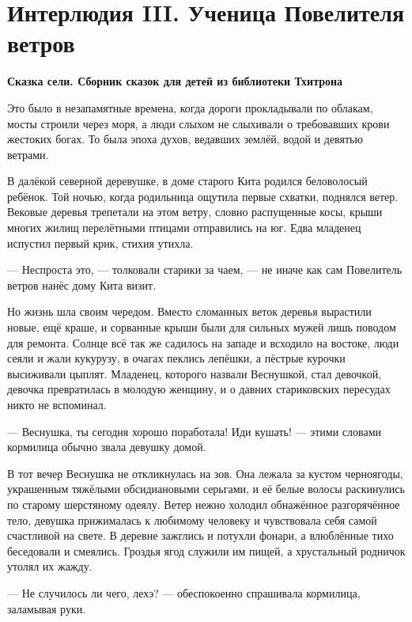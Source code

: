 \chapter*{Интерлюдия III. Ученица Повелителя ветров}


\textbf{Сказка сели.
Сборник сказок для детей из библиотеки Тхитрона}

Это было в незапамятные времена, когда дороги прокладывали по облакам, мосты строили через моря, а люди слыхом не слыхивали о требовавших крови жестоких богах.
То была эпоха духов, ведавших землёй, водой и девятью ветрами\FM.

В далёкой северной деревушке, в доме старого Кита родился беловолосый ребёнок.
Той ночью, когда родильница ощутила первые схватки, поднялся ветер.
Вековые деревья трепетали на этом ветру, словно распущенные косы, крыши многих жилищ перелётными птицами отправились на юг.
Едва младенец испустил первый крик, стихия утихла.

--- Неспроста это, --- толковали старики за чаем, --- не иначе как сам Повелитель ветров нанёс дому Кита визит.

Но жизнь шла своим чередом.
Вместо сломанных веток деревья вырастили новые, ещё краше, и сорванные крыши были для сильных мужей лишь поводом для ремонта.
Солнце всё так же садилось на западе и всходило на востоке, люди сеяли и жали кукурузу, в очагах пеклись лепёшки, а пёстрые курочки высиживали цыплят.
Младенец, которого назвали Веснушкой, стал девочкой, девочка превратилась в молодую женщину, и о давних стариковских пересудах никто не вспоминал.

--- Веснушка, ты сегодня хорошо поработала!
Иди кушать! --- этими словами кормилица обычно звала девушку домой.

В тот вечер Веснушка не откликнулась на зов.
Она лежала за кустом черноягоды, украшенным тяжёлыми обсидиановыми серьгами, и её белые волосы раскинулись по старому шерстяному одеялу.
Ветер нежно холодил обнажённое разгорячённое тело, девушка прижималась к любимому человеку и чувствовала себя самой счастливой на свете.
В деревне зажглись и потухли фонари, а влюблённые тихо беседовали и смеялись.
Гроздья ягод служили им пищей, а хрустальный родничок утолял их жажду.

--- Не случилось ли чего, лехэ? --- обеспокоенно спрашивала кормилица, заламывая руки.

